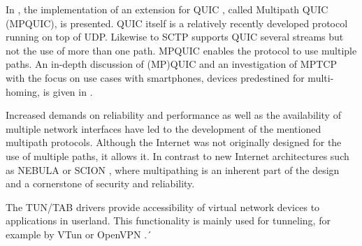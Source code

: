 In \cite{MPQUICPaper}, the implementation of an extension for QUIC \cite{quic-transport-29, QUICChromium}, called Multipath QUIC (MPQUIC), is presented. QUIC itself is a relatively recently developed protocol running on top of UDP. Likewise to SCTP supports QUIC several streams but not the use of more than one path. MPQUIC enables the protocol to use multiple paths. An in-depth discussion of (MP)QUIC and an investigation of MPTCP with the focus on use cases with smartphones, devices predestined for multi-homing, is given in \cite{MPQUICThesis}.

Increased demands on reliability and performance as well as the availability of multiple network interfaces have led to the development of the mentioned multipath protocols.  Although the Internet was not originally designed for the use of multiple paths, it allows it.  In contrast to new Internet architectures such as NEBULA \cite{NEBULA} or SCION \cite{SCIONPaper, SCIONBook}, where multipathing is an inherent part of the design and a cornerstone of security and reliability. 

The TUN/TAB drivers \cite{TUNTAPDriver} provide accessibility of virtual network devices to applications in userland. This functionality is mainly used for tunneling, for example by VTun \cite{VTun} or OpenVPN \cite{OpenVPN}.´
